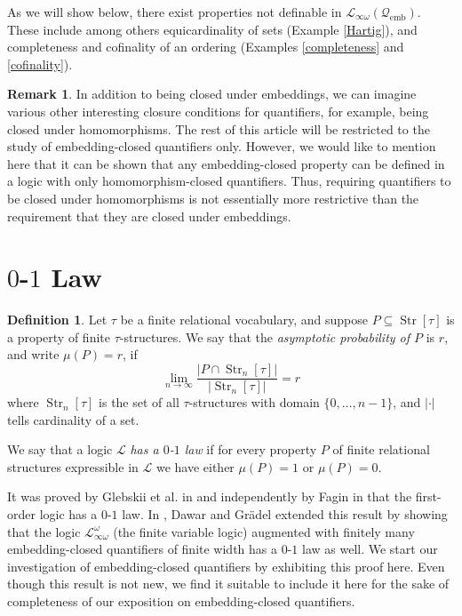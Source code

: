 \documentclass{ndjflart}
\theoremstyle{plain}
\theoremstyle{definition}
\newtheorem{definition}[conjecture]{Definition}
\newtheorem{remark}[conjecture]{Remark}
\numberwithin{equation}{section}
\DeclareMathOperator{\emb}{emb}
\DeclareMathOperator{\Str}{Str}
\begin{document}
As we will show below, there exist properties not definable in
$\mathcal{L}_{\infty \omega}(\mathcal{Q}_{\emb})$.
These include among others equicardinality of sets (Example \ref{Hartig}), and
completeness and cofinality of an ordering (Examples \ref{completeness} and
\ref{cofinality}).

\begin{remark}
In addition to being closed under embeddings, we can imagine vari\-ous other
interesting closure conditions for quantifiers, for example, being closed under
homomorphisms.
The rest of this article will be restricted to the study of
embedding-closed quantifiers only.
However, we would like to mention here that it can be shown
that any embedding-closed property can
be defined in a logic with only homomorphism-closed quantifiers.
Thus, requiring quantifiers to be closed under homomorphisms is not essentially
more restrictive than the requirement that they are closed under embeddings.
\end{remark}


\section{$0$-$1$ Law}\label{law}

\begin{definition}
Let $\tau$ be a finite relational vocabulary, and suppose
$P \subseteq \Str[\tau]$ is a property of finite $\tau$-structures.
We say that the \emph{asymptotic probability of $P$} is $r$, and write
$\mu(P) = r$, if
\[
	\lim_{n\rightarrow\infty} \frac{|P \cap \Str_n[\tau]|}{|\Str_n[\tau]|} = r
\]
where $\Str_n[\tau]$ is the set of all $\tau$-structures with domain
$\{0,\dots,n-1\}$, and $|\cdot|$ tells cardinality of a set.

We say that a logic $\mathcal{L}$ \emph{has a $0$-$1$ law} if for every property
$P$ of finite relational structures expressible in $\mathcal{L}$ we have either
$\mu(P) = 1$ or $\mu(P) = 0$.
\end{definition}

It was proved by Glebskii et al. in \cite{Glebskii:1969} and independently by
Fagin in \cite{Fagin:1976} that the first-order logic has a $0$-$1$ law.
In \cite{Dawar:2010}, Dawar and Gr\"adel extended this result by showing that
the logic $\mathcal{L}^{\omega}_{\infty \omega}$ (the finite variable logic)
augmented with finitely many embedding-closed quantifiers of finite width has a
$0$-$1$ law as well.
We start our investigation of embedding-closed quantifiers by exhibiting this
proof here.
Even though this result is not new, we find it suitable to include it here for
the sake of completeness of our exposition on embedding-closed quantifiers.
\end{document}
